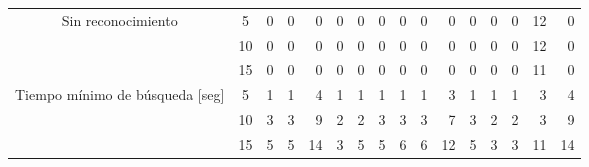 \begin{sidewaystable}
\begin{tabular}{@{}ccc|rrrrrrrrrrrrrr@{}}
\midrule
\multicolumn{2}{c}{\multirow{3}{*}{Sin reconocimiento}}            & 5                    & 0                      & 0                      & 0                      & 0                      & 0                      & 0                      & 0                      & 0                      & 0                      & 0                      & 0                      & 0                      & 12                     & 0                      \\
\multicolumn{2}{c}{}                                               & 10                   & 0                      & 0                      & 0                      & 0                      & 0                      & 0                      & 0                      & 0                      & 0                      & 0                      & 0                      & 0                      & 12                     & 0                      \\
\multicolumn{2}{c}{}                                               & 15                   & 0                      & 0                      & 0                      & 0                      & 0                      & 0                      & 0                      & 0                      & 0                      & 0                      & 0                      & 0                      & 11                     & 0                      \\
\midrule
\multicolumn{2}{c}{\multirow{3}{*}{Tiempo mínimo de búsqueda {[}seg{]}}}     & 5                    & 1                      & 1                      & 4                      & 1                      & 1                      & 1                      & 1                      & 1                      & 3                      & 1                      & 1                      & 1                      & 3                      & 4                      \\
\multicolumn{2}{c}{}                                               & 10                   & 3                      & 3                      & 9                      & 2                      & 2                      & 3                      & 3                      & 3                      & 7                      & 3                      & 2                      & 2                      & 3                      & 9                      \\
\multicolumn{2}{c}{}                                               & 15                   & 5                      & 5                      & 14                     & 3                      & 5                      & 5                      & 6                      & 6                      & 12                     & 5                      & 3                      & 3                      & 11                     & 14                     \\

\end{tabular}
\end{sidewaystable}
